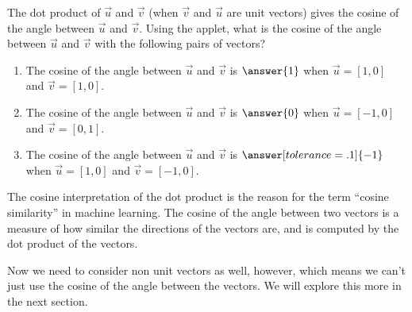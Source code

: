 \documentclass{ximera}
\begin{document}

\begin{center}
\end{center}

\begin{problem}
The dot product of $\vec{u}$ and $\vec{v}$ (when $\vec{v}$  and $\vec{u}$ are unit vectors) gives the cosine of the angle between $\vec{u}$ and $\vec{v}$.
Using the applet, what is the cosine of the angle between $\vec{u}$ and $\vec{v}$ with the following pairs of vectors?
\begin{enumerate}
\item The cosine of the angle between $\vec{u}$ and $\vec{v}$ is $\answer{1}$ when $\vec{u}=[1,0]$ and $\vec{v}=[1,0]$.
\item The cosine of the angle between $\vec{u}$ and $\vec{v}$ is $\answer{0}$ when $\vec{u}=[-1,0]$ and $\vec{v}=[0,1]$.
\item The cosine of the angle between $\vec{u}$ and $\vec{v}$ is $\answer[tolerance=.1]{-1}$ when $\vec{u}=[1,0]$ and $\vec{v}=[-1,0]$.
\end{enumerate}
\end{problem}

\begin{remark}
    The cosine interpretation of the dot product is the reason for the term ``cosine similarity'' in machine learning. The cosine of the angle between two vectors is a measure of how similar the directions of the vectors are, and is computed by the dot product of the vectors.
\end{remark}

Now we need to consider non unit vectors as well, however, which means we can't just use the cosine of the angle between the vectors. We will explore this more in the next section.
\end{document}
